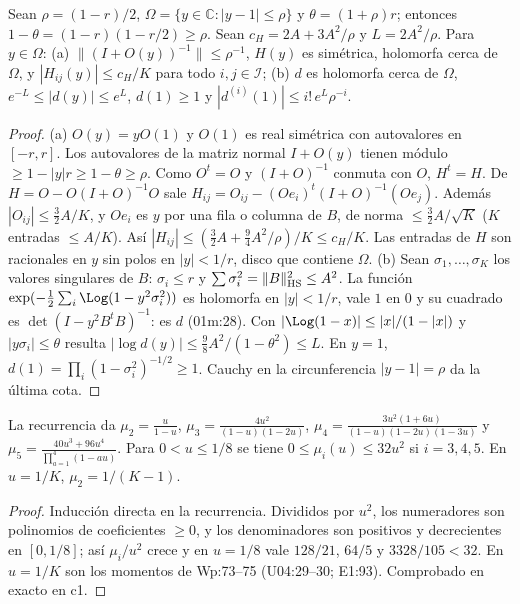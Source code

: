 \begin{lema}\label{lem:cotas}
Sean $\rho=(1-r)/2$, $\Omega=\{y\in\mathbb C:|y-1|\le\rho\}$ y $\theta=(1+\rho)r$; entonces
$1-\theta=(1-r)(1-r/2)\ge\rho$. Sean $c_H=2A+3A^2/\rho$ y $L=2A^2/\rho$. Para $y\in\Omega$:
(a) $\|(I+O(y))^{-1}\|\le\rho^{-1}$, $H(y)$ es simétrica, holomorfa cerca de $\Omega$, y
$|H_{ij}(y)|\le c_H/K$ para todo $i,j\in\mathcal I$;
(b) $d$ es holomorfa cerca de $\Omega$, $e^{-L}\le|d(y)|\le e^L$, $d(1)\ge1$ y
$|d^{(i)}(1)|\le i!\,e^L\rho^{-i}$.
\end{lema}
\begin{proof}
(a) $O(y)=yO(1)$ y $O(1)$ es real simétrica con autovalores en $[-r,r]$. Los autovalores de la
matriz normal $I+O(y)$ tienen módulo $\ge1-|y|r\ge1-\theta\ge\rho$. Como $O^t=O$ y $(I+O)^{-1}$
conmuta con $O$, $H^t=H$. De $H=O-O(I+O)^{-1}O$ sale $H_{ij}=O_{ij}-(Oe_i)^t(I+O)^{-1}(Oe_j)$.
Además $|O_{ij}|\le\frac32A/K$, y $Oe_i$ es $y$ por una fila o columna de $B$, de norma
$\le\frac32A/\sqrt K$ ($K$ entradas $\le A/K$). Así $|H_{ij}|\le(\frac32A+\frac94A^2/\rho)/K\le c_H/K$.
Las entradas de $H$ son racionales en $y$ sin polos en $|y|<1/r$, disco que contiene $\Omega$.
(b) Sean $\sigma_1,\dots,\sigma_K$ los valores singulares de $B$: $\sigma_i\le r$ y
$\sum\sigma_i^2=\|B\|_{\rm HS}^2\le A^2$. La función $\exp(-\frac12\sum_i\Log(1-y^2\sigma_i^2))$ es
holomorfa en $|y|<1/r$, vale $1$ en $0$ y su cuadrado es $\det(I-y^2B^tB)^{-1}$: es $d$ (01m:28).
Con $|\Log(1-x)|\le|x|/(1-|x|)$ y $|y\sigma_i|\le\theta$ resulta
$|\log d(y)|\le\frac98A^2/(1-\theta^2)\le L$. En $y=1$, $d(1)=\prod_i(1-\sigma_i^2)^{-1/2}\ge1$.
Cauchy en la circunferencia $|y-1|=\rho$ da la última cota.
\end{proof}

\begin{lema}\label{lem:mom}
La recurrencia da $\mu_2=\frac u{1-u}$, $\mu_3=\frac{4u^2}{(1-u)(1-2u)}$,
$\mu_4=\frac{3u^2(1+6u)}{(1-u)(1-2u)(1-3u)}$ y $\mu_5=\frac{40u^3+96u^4}{\prod_{a=1}^4(1-au)}$.
Para $0<u\le1/8$ se tiene $0\le\mu_i(u)\le32u^2$ si $i=3,4,5$. En $u=1/K$, $\mu_2=1/(K-1)$.
\end{lema}
\begin{proof}
Inducción directa en la recurrencia. Divididos por $u^2$, los numeradores son polinomios de
coeficientes $\ge0$, y los denominadores son positivos y decrecientes en $[0,1/8]$; así
$\mu_i/u^2$ crece y en $u=1/8$ vale $128/21$, $64/5$ y $3328/105<32$. En $u=1/K$ son los
momentos de Wp:73--75 (U04:29--30; E1:93). Comprobado en exacto en c1.
\end{proof}

